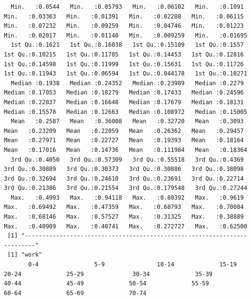 \documentclass[11pt]{article}
\begin{document}
\begin{itemize}
\begin{verbatim}
  Min.   :0.0544   Min.   :0.05793   Min.   :0.06102   Min.   :0.1091   Min.   :0.03363   Min.   :0.01391   Min.   :0.02288   Min.   :0.06115   Min.   :0.07232   Min.   :0.09259   Min.   :0.04746   Min.   :0.01223   Min.   :0.02017   Min.   :0.01140   Min.   :0.009259   Min.   :0.01695  
  1st Qu.:0.1621   1st Qu.:0.16038   1st Qu.:0.15109   1st Qu.:0.1557   1st Qu.:0.10215   1st Qu.:0.11785   1st Qu.:0.14453   1st Qu.:0.12816   1st Qu.:0.14598   1st Qu.:0.11999   1st Qu.:0.15631   1st Qu.:0.11726   1st Qu.:0.11943   1st Qu.:0.06594   1st Qu.:0.044178   1st Qu.:0.10271  
  Median :0.1938   Median :0.24352   Median :0.23989   Median :0.2279   Median :0.17053   Median :0.18279   Median :0.17433   Median :0.24596   Median :0.22837   Median :0.16648   Median :0.17679   Median :0.18131   Median :0.15578   Median :0.12663   Median :0.108972   Median :0.15005  
  Mean   :0.2587   Mean   :0.36008   Mean   :0.32720   Mean   :0.3093   Mean   :0.23209   Mean   :0.22059   Mean   :0.26362   Mean   :0.29457   Mean   :0.27971   Mean   :0.22727   Mean   :0.19393   Mean   :0.18164   Mean   :0.17016   Mean   :0.14736   Mean   :0.111984   Mean   :0.18364  
  3rd Qu.:0.4050   3rd Qu.:0.57309   3rd Qu.:0.55518   3rd Qu.:0.4369   3rd Qu.:0.30889   3rd Qu.:0.30373   3rd Qu.:0.30886   3rd Qu.:0.38098   3rd Qu.:0.32694   3rd Qu.:0.24610   3rd Qu.:0.23691   3rd Qu.:0.22714   3rd Qu.:0.21386   3rd Qu.:0.21554   3rd Qu.:0.179548   3rd Qu.:0.27244  
  Max.   :0.4993   Max.   :0.94118   Max.   :0.80392   Max.   :0.9619   Max.   :0.69492   Max.   :0.47359   Max.   :0.68793   Max.   :0.70084   Max.   :0.68146   Max.   :0.57527   Max.   :0.31325   Max.   :0.38889   Max.   :0.40909   Max.   :0.40741   Max.   :0.272727   Max.   :0.62500  
 [1] "-------------------------------------------------------------------------"
 [1] "work"
       0-4                5-9               10-14             15-19              20-24             25-29              30-34             35-39             40-44             45-49             50-54             55-59             60-64             65-69             70-74


\end{verbatim}
\end{itemize}
\end{document}

